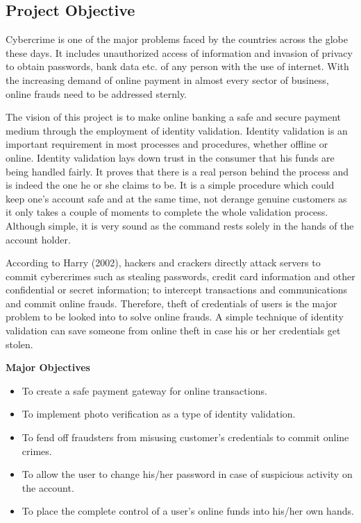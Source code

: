 \documentclass[12pt, oneside, a4paper]{article}
\begin{document}
\subsection{Project Objective}
Cybercrime is one of the major problems faced by the countries across the globe these days. It includes unauthorized access of information and invasion of privacy to obtain passwords, bank data etc. of any person with the use of internet. With the increasing demand of online payment in almost every sector of business, online frauds need to be addressed sternly. 

The vision of this project is to make online banking a safe and secure payment medium through the employment of identity validation. Identity validation is an important requirement in most processes and procedures, whether offline or online. Identity validation lays down trust in the consumer that his funds are being handled fairly. It proves that there is a real person behind the process and is indeed the one he or she claims to be. It is a simple procedure which could keep one's account safe and at the same time, not derange genuine customers as it only takes a couple of moments to complete the whole validation process. Although simple, it is very sound as the command rests solely in the hands of the account holder.

According to Harry (2002), hackers and crackers directly attack servers to commit cybercrimes such as stealing passwords, credit card information and other confidential or secret information; to intercept transactions and communications and commit online frauds\cite{Project_Objective}. Therefore, theft of credentials of users is the major problem to be looked into to solve online frauds. A simple technique of identity validation can save someone from online theft in case his or her credentials get stolen.

\vspace{1cm}
\textbf{Major Objectives}
\begin{itemize}
    \item To create a safe payment gateway for online transactions.
    \item To implement photo verification as a type of identity validation.
    \item To fend off fraudsters from misusing customer's credentials to commit online crimes.
    \item To allow the user to change his/her password in case of suspicious activity on the account.
    \item To place the complete control of a user's online funds into his/her own hands.
\end{itemize}
\end{document}
